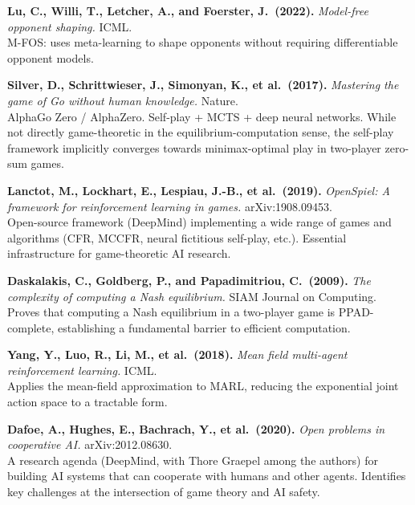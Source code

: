 \documentclass[11pt,a4paper]{article}
\theoremstyle{plain}
\theoremstyle{definition}
\begin{document}
\begin{enumerate}[label={[\arabic*]}, leftmargin=*, itemsep=6pt]
\item \textbf{Lu, C., Willi, T., Letcher, A., and Foerster, J.\ (2022).}
  \emph{Model-free opponent shaping.}  ICML.\\
  M-FOS: uses meta-learning to shape opponents without requiring
  differentiable opponent models.

\item \textbf{Silver, D., Schrittwieser, J., Simonyan, K., et al.\
  (2017).}  \emph{Mastering the game of Go without human knowledge.}
  Nature.\\
  AlphaGo Zero / AlphaZero.  Self-play + MCTS + deep neural networks.
  While not directly game-theoretic in the equilibrium-computation
  sense, the self-play framework implicitly converges towards
  minimax-optimal play in two-player zero-sum games.

\item \textbf{Lanctot, M., Lockhart, E., Lespiau, J.-B., et al.\ (2019).}
  \emph{OpenSpiel: A framework for reinforcement learning in games.}
  arXiv:1908.09453.\\
  Open-source framework (DeepMind) implementing a wide range of games
  and algorithms (CFR, MCCFR, neural fictitious self-play, etc.).
  Essential infrastructure for game-theoretic AI research.

\item \textbf{Daskalakis, C., Goldberg, P., and Papadimitriou, C.\
  (2009).}  \emph{The complexity of computing a Nash equilibrium.}
  SIAM Journal on Computing.\\
  Proves that computing a Nash equilibrium in a two-player game is
  PPAD-complete, establishing a fundamental barrier to efficient
  computation.

\item \textbf{Yang, Y., Luo, R., Li, M., et al.\ (2018).}  \emph{Mean
  field multi-agent reinforcement learning.}  ICML.\\
  Applies the mean-field approximation to MARL, reducing the
  exponential joint action space to a tractable form.

\item \textbf{Dafoe, A., Hughes, E., Bachrach, Y., et al.\ (2020).}
  \emph{Open problems in cooperative AI.}  arXiv:2012.08630.\\
  A research agenda (DeepMind, with Thore Graepel among the authors)
  for building AI systems that can cooperate with humans and other
  agents.  Identifies key challenges at the intersection of game theory
  and AI safety.


\end{enumerate}
\end{document}
